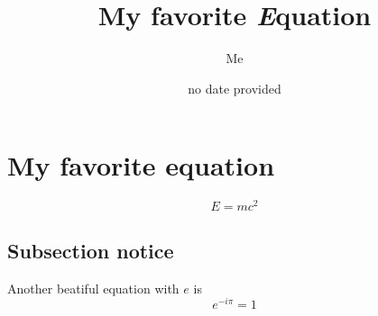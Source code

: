 \documentclass{article}
\title{My favorite \textit{E}quation}
\author{Me}
\date{no date provided}
\begin{document}
\maketitle

\tableofcontents
\newpage
\section{My favorite equation} 
\begin{equation}
E = mc^2
\end{equation}
\subsection*{Subsection notice}
Another beatiful equation with $e$ is 
$$
e^{-i\pi}=1
$$
\end{document}

